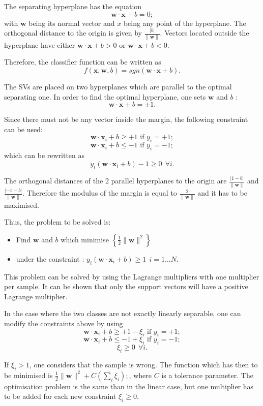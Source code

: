     The separating hyperplane has the equation
    $$\mathbf{w}\cdot\mathbf{x}+b=0;$$ with $\mathbf{w}$ being its
    normal vector and $x$ being any point of the hyperplane. The
    orthogonal distance to the origin is given by
    $\frac{|b|}{\|\mathbf{w}\|}$. Vectors located outside the
    hyperplane have either $\mathbf{w}\cdot\mathbf{x}+b>0$ or
      $\mathbf{w}\cdot\mathbf{x}+b<0$.

    Therefore, the classifier function can be written as
    $$f(\mathbf{x},\mathbf{w}, b)=sgn(\mathbf{w}\cdot\mathbf{x}+b).$$
    
The SVs are placed on two hyperplanes which are parallel to the
      optimal separating one. In order to find the optimal
      hyperplane, one sets $\mathbf{w}$ and
      $b$ : $$\mathbf{w}\cdot\mathbf{x}+b=\pm 1.$$

Since there must not be any vector inside the margin, the following
constraint can be used:
    $$\mathbf{w}\cdot\mathbf{x}_i+b\ge +1\text{ if }y_i=+1;$$
    $$\mathbf{w}\cdot\mathbf{x}_i+b\le -1\text{ if }y_i=-1;$$ which
    can be rewritten as $$y_i(\mathbf{w}\cdot\mathbf{x}_i+b)-1\ge 0~  ~ \forall i.$$

    The orthogonal distances of the 2 parallel hyperplanes to the
    origin are $\frac{|1-b|}{\|\mathbf{w}\|}$ and
      $\frac{|-1-b|}{\|\mathbf{w}\|}$. Therefore the modulus of the
    margin is equal to $\frac{2}{\|\mathbf{w}\|}$ and it has to be
    maximised.

    Thus, the problem to be solved is:

	\begin{itemize}
	\item Find $\mathbf{w}$ and $b$ which minimise
	 $\left\{ \frac{1}{2}\|\mathbf{w}\|^2 \right\}$
	\item under the constraint :
	 $y_i(\mathbf{w}\cdot\mathbf{x}_i+b)\ge 1~  ~ i=1\ldots N.$
	\end{itemize}

	This problem can be solved by using the Lagrange multipliers
	with one multiplier per sample. It can be shown that only the
	support vectors will have a positive Lagrange multiplier.

	In the case where the two classes are not exactly linearly
	separable, one can modify the constraints above by using 
      $$\mathbf{w}\cdot\mathbf{x}_i+b\ge +1 - \xi_i \text{ if }y_i=+1;$$
    $$\mathbf{w}\cdot\mathbf{x}_i+b\le -1+\xi_i \text{ if }y_i=-1;$$
    $$\xi_i\ge 0~  ~\forall i.$$

	If $\xi_i > 1$, one considers that the sample is wrong. The
	function which has then to be minimised is
	$\frac{1}{2}\|\mathbf{w}\|^2 + C\left( \sum_i \xi_i\right); $,
	where $C$ is a tolerance parameter. The optimisation problem
	is the same than in the linear case, but one multiplier has to
	be added for each new constraint $\xi_i\ge 0$.

